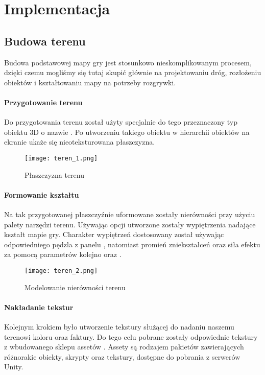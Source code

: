 \section{Implementacja}
\subsection{Budowa terenu}\label{subsec:budowa_terenu}
Budowa podstawowej mapy gry jest stosunkowo nieskomplikowanym procesem, dzięki czemu mogliśmy się tutaj skupić głównie na projektowaniu dróg, rozłożeniu obiektów i kształtowaniu mapy na potrzeby rozgrywki.

\paragraph{Przygotowanie terenu}

    Do przygotowania terenu został użyty specjalnie do tego przeznaczony typ obiektu 3D o nazwie . Po utworzeniu takiego obiektu w hierarchii obiektów na ekranie ukaże się nieoteksturowana płaszczyzna.

    \begin{figure}[H]
    \texttt{[image: teren\_1.png]}
    \caption{Płaszczyzna terenu}
    \end{figure}

\paragraph{Formowanie kształtu} 

    Na tak przygotowanej płaszczyźnie uformowane zostały nierówności przy użyciu palety narzędzi terenu. Używając opcji  utworzone zostały wypiętrzenia nadające kształt mapie gry. Charakter wypiętrzeń dostosowany został używając odpowiedniego pędzla z panelu , natomiast promień zniekształceń oraz siła efektu za pomocą parametrów kolejno  oraz .

    \begin{figure}[H]
    \texttt{[image: teren\_2.png]}
    \caption{Modelowanie nierówności terenu}
    \end{figure}

\paragraph{Nakładanie tekstur}

    Kolejnym krokiem było utworzenie tekstury służącej do nadaniu naszemu terenowi koloru oraz faktury. Do tego celu pobrane zostały odpowiednie tekstury z wbudowanego sklepu assetów . Assety są rodzajem pakietów zawierających różnorakie obiekty, skrypty oraz tekstury, dostępne do pobrania z serwerów Unity.

